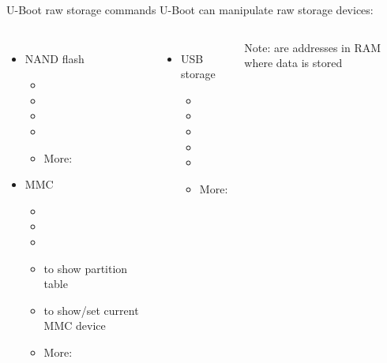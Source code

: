 \begin{frame}{U-Boot raw storage commands}
  U-Boot can manipulate raw storage devices:
  \begin{columns}
    \begin{itemize}
    \item NAND flash
      \begin{itemize}
      \item {}
      \item {}
      \item {}
      \item {}
      \item More: 
      \end{itemize}
    \item MMC
      \begin{itemize}
      \item {}
      \item {}
      \item {}
      \item {} to show partition table
      \item {} to show/set current MMC device
      \item More: 
      \end{itemize}
    \end{itemize}
    \vfill
    \begin{itemize}
    \item USB storage
      \begin{itemize}
      \item {}
      \item {}
      \item {}
      \item {}
      \item {}
      \item More: 
      \end{itemize}
    \end{itemize}
    Note:  are addresses in RAM where data is stored
  \end{columns}
  \vspace{0.2cm}
\end{frame}

